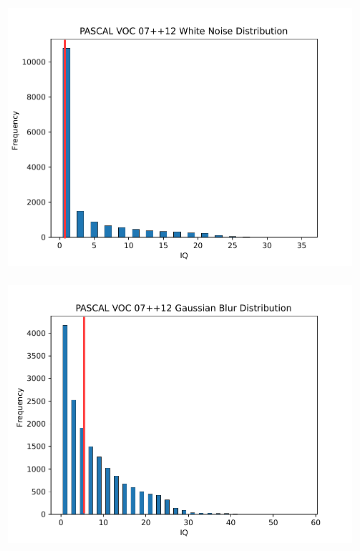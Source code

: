 \begin{figure}[H]
    \centering
    \begin{subfigure}[b]{0.4\textwidth}
        \center
        \includegraphics[width=\textwidth]{Figs/Implementation/WhiteNoisedistred.pdf}
        \caption{}\label{fig:dist_wn}
    \end{subfigure}
    \begin{subfigure}[b]{0.4\textwidth}
        \center
        \includegraphics[width=\textwidth]{Figs/Implementation/GaussianBlurdistred.pdf}
        \caption{}\label{fig:dist_gb}
    \end{subfigure}
    \begin{subfigure}[b]{0.4\textwidth}
        \center

\end{subfigure}
\end{figure}
